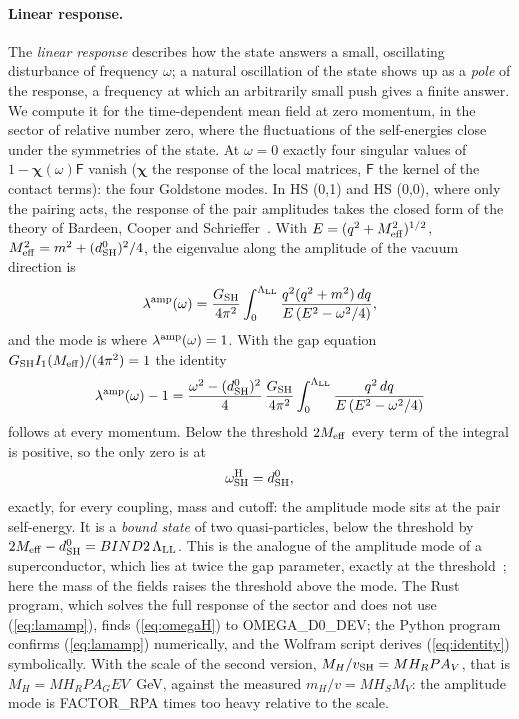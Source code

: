 \documentclass[aps,prd,twocolumn,superscriptaddress,nofootinbib,floatfix,longbibliography]{revtex4-2}
\newcommand{\LL}{{\rm LL}}
\newcommand{\SH}{{\rm SH}}
\begin{document}
\paragraph*{Linear response.}
The \emph{linear response} describes how the state answers a small, oscillating disturbance of frequency $\omega$; a
natural oscillation of the state shows up as a \emph{pole} of the response, a frequency at which an arbitrarily small
push gives a finite answer. We compute it for the time-dependent mean field at zero momentum, in the sector of relative
number zero, where the fluctuations of the self-energies close under the symmetries of the state. At $\omega=0$ exactly
four singular values of $1-\bm\chi(\omega)\mathsf F$ vanish ($\bm\chi$ the response of the local matrices, $\mathsf F$
the kernel of the contact terms): the four Goldstone modes. In HS (0,1) and HS (0,0), where only the pairing acts, the
response of the pair amplitudes takes the closed form of the theory of Bardeen, Cooper and Schrieffer~\cite{BCS1957}.
With $E=(q^2+M_{\rm eff}^2)^{1/2}$, $M_{\rm eff}^2=m^2+(d^0_\SH)^2/4$, the eigenvalue along the amplitude of the vacuum
direction is
\begin{equation}
\lambda^{\rm amp}(\omega)=\frac{G_\SH}{4\pi^2}\int_0^{\Lambda_\LL}\frac{q^2(q^2+m^2)\,dq}{E\,(E^2-\omega^2/4)} ,
\label{eq:lamamp}
\end{equation}
and the mode is where $\lambda^{\rm amp}(\omega)=1$. With the gap equation $G_\SH I_1(M_{\rm eff})/(4\pi^2)=1$ the identity
\begin{equation}
\lambda^{\rm amp}(\omega)-1=\frac{\omega^2-(d^0_\SH)^2}{4}\,\frac{G_\SH}{4\pi^2}\int_0^{\Lambda_\LL}\frac{q^2\,dq}{E\,(E^2-\omega^2/4)}
\label{eq:identity}
\end{equation}
follows at every momentum. Below the threshold $2M_{\rm eff}$ every term of the integral is positive, so the only zero
is at
\begin{equation}
\omega^{\rm H}_\SH=d^0_\SH ,
\label{eq:omegaH}
\end{equation}
exactly, for every coupling, mass and cutoff: the amplitude mode sits at the pair self-energy. It is a \emph{bound state}
of two quasi-particles, below the threshold by $2M_{\rm eff}-d^0_\SH={{BIND2}}\,\Lambda_\LL$. This is the analogue of the
amplitude mode of a superconductor, which lies at twice the gap parameter, exactly at the
threshold~\cite{LittlewoodVarma1981,PekkerVarma2015}; here the mass of the fields raises the threshold above the mode. The Rust program, which solves the
full response of the sector and does not use (\ref{eq:lamamp}), finds (\ref{eq:omegaH}) to {{OMEGA_D0_DEV}}; the Python
program confirms (\ref{eq:lamamp}) numerically, and the Wolfram script derives (\ref{eq:identity}) symbolically. With the
scale of the second version, $M_H/v_\SH={{MH_RPA_V}}$, that is $M_H={{MH_RPA_GEV}}$~GeV, against the measured
$m_H/v={{MH_SM_V}}$: the amplitude mode is {{FACTOR_RPA}} times too heavy relative to the scale.
\end{document}
